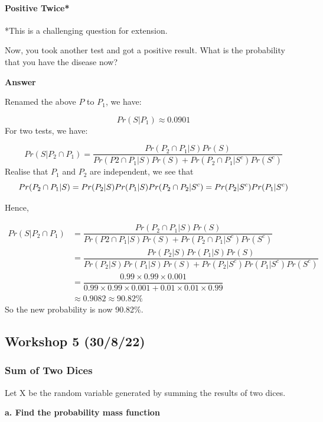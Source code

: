 \documentclass[
]{article}
\begin{document}
\hypertarget{positive-twice}{%
\paragraph{Positive Twice*}\label{positive-twice}}

*This is a challenging question for extension.

Now, you took another test and got a positive result. What is the
probability that you have the disease now?

\textbf{Answer}

Renamed the above \(P\) to \(P_1\), we have:

\[
Pr(S|P_1) \approx 0.0901
\] For two tests, we have:

\[
Pr(S|P_2 \cap P_1) = \dfrac{Pr(P_2 \cap P_1 | S)Pr(S)}{Pr(P2\cap P_1|S)Pr(S) + Pr(P_2 \cap P_1|S^c)Pr(S^c)}
\] Realise that \(P_1\) and \(P_2\) are independent, we see that \[
Pr(P_2\cap P_1|S)=Pr(P_2|S)Pr(P_1|S)\\
Pr(P_2\cap P_2|S^c)=Pr(P_2|S^c)Pr(P_1|S^c)
\]

Hence,

\[
\begin{aligned}
Pr(S|P_2 \cap P_1) &= \dfrac{Pr(P_2 \cap P_1 | S)Pr(S)}{Pr(P2\cap P_1|S)Pr(S) + Pr(P_2 \cap P_1|S^c)Pr(S^c)}\\
&=\dfrac{Pr(P_2|S)Pr(P_1|S)Pr(S)}{Pr(P_2|S)Pr(P_1|S)Pr(S) + Pr(P_2|S^c)Pr(P_1|S^c)Pr(S^c)}\\
&=\dfrac{0.99\times0.99\times0.001}{0.99\times0.99\times0.001 + 0.01\times0.01\times0.99}\\
&\approx0.9082 \approx 90.82\%
\end{aligned}
\] So the new probability is now 90.82\%.

\hypertarget{workshop-5-30822}{%
\subsection{Workshop 5 (30/8/22)}\label{workshop-5-30822}}

\hypertarget{sum-of-two-dices}{%
\subsubsection{Sum of Two Dices}\label{sum-of-two-dices}}

Let X be the random variable generated by summing the results of two
dices.

\textbf{a. Find the probability mass function}
\end{document}
